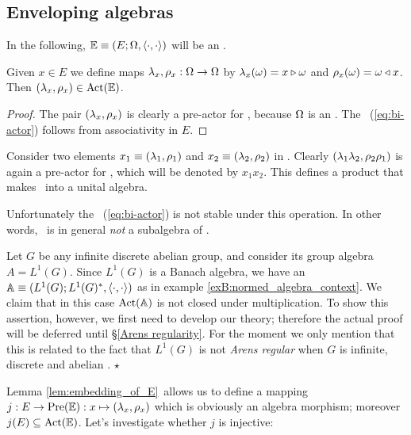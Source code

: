 \subsection{Enveloping algebras}
\label{par:enveloping_algebras}

In the following, $\mathbb{E} \equiv (E; \Omega, \langle\cdot, \cdot\rangle)$ will be an \context\@.

\begin{lemma} \label{lem:embedding_of_E}
  Given $x\in E$ we define maps $\lambda_x,\rho_x : \Omega \rightarrow \Omega$ by
  $\lambda_x(\omega) = x \triangleright \omega$ and $\rho_x(\omega) = \omega \triangleleft x$.
  Then $(\lambda_x,\rho_x) \in \mbox{\rm Act}(\mathbb{E})$.
\end{lemma}
\begin{proof}
   The pair $(\lambda_x,\rho_x)$ is clearly a pre-actor for \EE, because $\Omega$ is an \Ebimod\@.
   The \biap\ (\ref{eq:bi-actor}) follows from associativity in $E$.
\end{proof}

\begin{defn} \label{def:product_of_actors}
  Consider two elements $x_1 \equiv (\lambda_1,\rho_1)$ and $x_2 \equiv (\lambda_2,\rho_2)$ in \PreE\@.
  Clearly $(\lambda_1\lambda_2,\rho_2\rho_1)$ is again a pre-actor for \EE,
  which will be denoted by $x_1 x_2$.
  This defines a product that makes \PreE\ into a unital algebra.
\end{defn}

Unfortunately the \biap\ (\ref{eq:bi-actor}) is not stable under this operation.
In other words, \ActE\ is in general {\em not\/} a subalgebra of \PreE\@.

{\small
\begin{exB} \label{exB:Act_not_an_algebra} \rm
Let $G$ be any infinite discrete abelian group, and consider its group algebra $A=L^1(G)$.
Since $L^1(G)$ is a Banach algebra, we have an \context\
$\mathbb{A} \equiv (L^1(G); L^1(G)^*, \langle\cdot, \cdot\rangle)$ as in example \ref{exB:normed_algebra_context}\@.
We claim that in this case $\mbox{\rm Act}(\mathbb{A})$ is not closed under multiplication.
To show this assertion, however, we first need to develop our theory;
therefore the actual proof will be deferred until \S \ref{Arens regularity}\@.
For the moment we only mention that this is related to the fact that
$L^1(G)$ is not {\em Arens regular\/} when $G$ is infinite, discrete and abelian
\cite{civin_yood}\@.
\hfill $\star$
\end{exB}
}


Lemma \ref{lem:embedding_of_E}\ allows us to define a mapping
$j:E \rightarrow \mbox{\rm Pre}(\mathbb{E}): x \mapsto (\lambda_x,\rho_x)$ which is obviously an algebra morphism;
moreover $j(E)\subseteq \mbox{\rm Act}(\mathbb{E})$. Let's investigate whether $j$ is injective:

